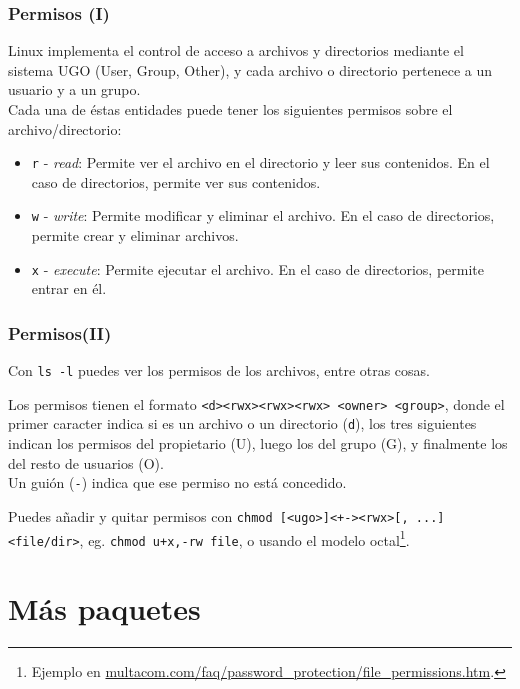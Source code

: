 \documentclass[aspectratio=43]{beamer}
\begin{document}
\begin{frame}
    \frametitle{Permisos (I)}
    Linux implementa el control de acceso a archivos y directorios mediante el sistema UGO (User, Group, Other), y cada archivo o directorio pertenece a un usuario y a un grupo.\\
    Cada una de éstas entidades puede tener los siguientes permisos sobre el archivo/directorio:
    \begin{itemize}
        \item \texttt{r} - \textit{read}: Permite ver el archivo en el directorio y leer sus contenidos. En el caso de directorios, permite ver sus contenidos.
        \item \texttt{w} - \textit{write}: Permite modificar y eliminar el archivo. En el caso de directorios, permite crear y eliminar archivos.
        \item \texttt{x} - \textit{execute}: Permite ejecutar el archivo. En el caso de directorios, permite entrar en él.
    \end{itemize}

\end{frame}


\begin{frame}
    \frametitle{Permisos(II)}
    Con \texttt{ls -l} puedes ver los permisos de los archivos, entre otras cosas.\newline

    Los permisos tienen el formato \texttt{<d><rwx><rwx><rwx> <owner> <group>}, donde el primer caracter indica si es un archivo o un directorio (\texttt{d}), los tres siguientes indican los permisos del propietario (U), luego los del grupo (G), y finalmente los del resto de usuarios (O).\\
    Un guión (\texttt{-}) indica que ese permiso no está concedido.\newline

    Puedes añadir y quitar permisos con \texttt{chmod [<ugo>]<+-><rwx>[, ...] <file/dir>}, eg. \texttt{chmod u+x,-rw file}, o usando el modelo octal\footnote{Ejemplo en \href{https://www.multacom.com/faq/password_protection/file_permissions.htm}{multacom.com/faq/password\_protection/file\_permissions.htm}.}.

\end{frame}


\section{Más paquetes}
\end{document}
